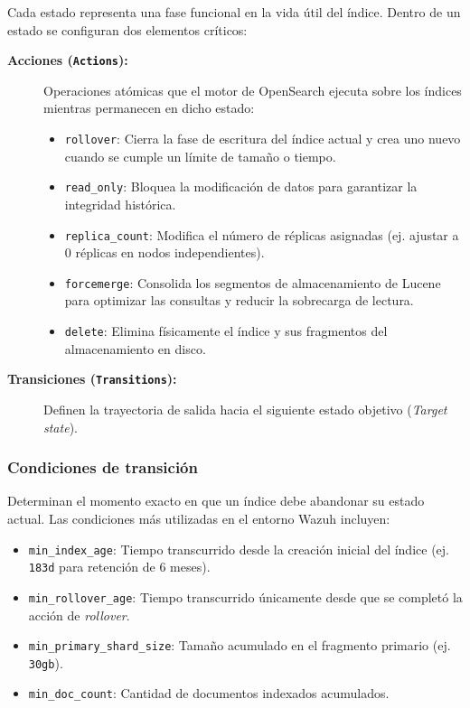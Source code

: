 Cada estado representa una fase funcional en la vida útil del índice. Dentro de un estado se configuran dos elementos críticos:

\begin{description}
    \item[\textbf{Acciones (\texttt{Actions}):}] Operaciones atómicas que el motor de OpenSearch ejecuta sobre los índices mientras permanecen en dicho estado:
    \begin{itemize}
        \item \texttt{rollover}: Cierra la fase de escritura del índice actual y crea uno nuevo cuando se cumple un límite de tamaño o tiempo.
        \item \texttt{read\_only}: Bloquea la modificación de datos para garantizar la integridad histórica.
        \item \texttt{replica\_count}: Modifica el número de réplicas asignadas (ej. ajustar a $0$ réplicas en nodos independientes).
        \item \texttt{forcemerge}: Consolida los segmentos de almacenamiento de Lucene para optimizar las consultas y reducir la sobrecarga de lectura.
        \item \texttt{delete}: Elimina físicamente el índice y sus fragmentos del almacenamiento en disco.
    \end{itemize}

    \item[\textbf{Transiciones (\texttt{Transitions}):}] Definen la trayectoria de salida hacia el siguiente estado objetivo (\textit{Target state}).
\end{description}

\subsubsection{Condiciones de transición}
Determinan el momento exacto en que un índice debe abandonar su estado actual. Las condiciones más utilizadas en el entorno Wazuh incluyen:

\begin{itemize}
    \item \texttt{min\_index\_age}: Tiempo transcurrido desde la creación inicial del índice (ej. \texttt{183d} para retención de 6 meses).
    \item \texttt{min\_rollover\_age}: Tiempo transcurrido únicamente desde que se completó la acción de \textit{rollover}.
    \item \texttt{min\_primary\_shard\_size}: Tamaño acumulado en el fragmento primario (ej. \texttt{30gb}).
    \item \texttt{min\_doc\_count}: Cantidad de documentos indexados acumulados.
\end{itemize}

